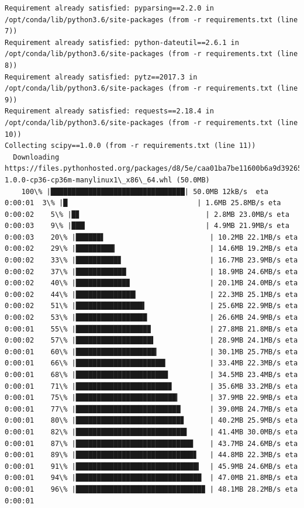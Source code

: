 \documentclass[11pt]{article}
\begin{document}
\begin{Verbatim}[commandchars=\\\{\}]
Requirement already satisfied: pyparsing==2.2.0 in /opt/conda/lib/python3.6/site-packages (from -r requirements.txt (line 7))
Requirement already satisfied: python-dateutil==2.6.1 in /opt/conda/lib/python3.6/site-packages (from -r requirements.txt (line 8))
Requirement already satisfied: pytz==2017.3 in /opt/conda/lib/python3.6/site-packages (from -r requirements.txt (line 9))
Requirement already satisfied: requests==2.18.4 in /opt/conda/lib/python3.6/site-packages (from -r requirements.txt (line 10))
Collecting scipy==1.0.0 (from -r requirements.txt (line 11))
  Downloading https://files.pythonhosted.org/packages/d8/5e/caa01ba7be11600b6a9d39265440d7b3be3d69206da887c42bef049521f2/scipy-1.0.0-cp36-cp36m-manylinux1\_x86\_64.whl (50.0MB)
    100\% |████████████████████████████████| 50.0MB 12kB/s  eta 0:00:01  3\% |█                               | 1.6MB 25.8MB/s eta 0:00:02    5\% |█▊                              | 2.8MB 23.0MB/s eta 0:00:03    9\% |███▏                            | 4.9MB 21.9MB/s eta 0:00:03    20\% |██████▌                         | 10.2MB 22.1MB/s eta 0:00:02    29\% |█████████▎                      | 14.6MB 19.2MB/s eta 0:00:02    33\% |██████████▊                     | 16.7MB 23.9MB/s eta 0:00:02    37\% |████████████                    | 18.9MB 24.6MB/s eta 0:00:02    40\% |████████████▉                   | 20.1MB 24.0MB/s eta 0:00:02    44\% |██████████████▎                 | 22.3MB 25.1MB/s eta 0:00:02    51\% |████████████████▍               | 25.6MB 22.9MB/s eta 0:00:02    53\% |█████████████████               | 26.6MB 24.9MB/s eta 0:00:01    55\% |█████████████████▉              | 27.8MB 21.8MB/s eta 0:00:02    57\% |██████████████████▌             | 28.9MB 24.1MB/s eta 0:00:01    60\% |███████████████████▎            | 30.1MB 25.7MB/s eta 0:00:01    66\% |█████████████████████▍          | 33.4MB 22.3MB/s eta 0:00:01    68\% |██████████████████████          | 34.5MB 23.4MB/s eta 0:00:01    71\% |██████████████████████▉         | 35.6MB 33.2MB/s eta 0:00:01    75\% |████████████████████████▎       | 37.9MB 22.9MB/s eta 0:00:01    77\% |█████████████████████████       | 39.0MB 24.7MB/s eta 0:00:01    80\% |█████████████████████████▊      | 40.2MB 25.9MB/s eta 0:00:01    82\% |██████████████████████████▌     | 41.4MB 30.0MB/s eta 0:00:01    87\% |████████████████████████████    | 43.7MB 24.6MB/s eta 0:00:01    89\% |████████████████████████████▊   | 44.8MB 22.3MB/s eta 0:00:01    91\% |█████████████████████████████▍  | 45.9MB 24.6MB/s eta 0:00:01    94\% |██████████████████████████████  | 47.0MB 21.8MB/s eta 0:00:01    96\% |██████████████████████████████▉ | 48.1MB 28.2MB/s eta 0:00:01

\end{Verbatim}
\end{document}
